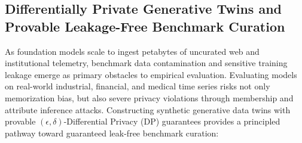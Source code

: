 \subsection{Differentially Private Generative Twins and Provable Leakage-Free Benchmark Curation}
\label{sec:dp_generative_twins}

As foundation models scale to ingest petabytes of uncurated web and institutional telemetry, benchmark data contamination and sensitive training leakage emerge as primary obstacles to empirical evaluation. Evaluating models on real-world industrial, financial, and medical time series risks not only memorization bias, but also severe privacy violations through membership and attribute inference attacks. Constructing synthetic generative data twins with provable $(\epsilon, \delta)$-Differential Privacy (DP) guarantees provides a principled pathway toward guaranteed leak-free benchmark curation:


